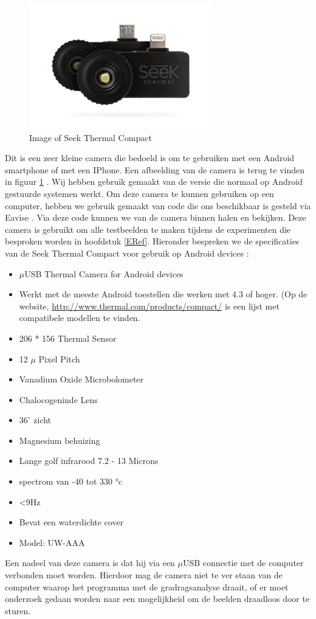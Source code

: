 \begin{figure}[hbp]
	\includegraphics[scale=0.75]{SeekThermalCompac}
	\caption{Image of Seek Thermal Compact}
	\label{imgSTC}
\end{figure}
Dit is een zeer kleine camera die bedoeld is om te gebruiken met een Android smartphone of met een IPhone. Een afbeelding van de camera is terug te vinden in figuur \ref{imgSTC} \cite{bibImgSTC}. Wij hebben gebruik gemaakt van de versie die normaal op Android gestuurde systemen werkt. Om deze camera te kunnen gebruiken op een computer, hebben we gebruik gemaakt van code die ons beschikbaar is gesteld via Eavise \cite{bibSTC}. Via deze code kunnen we van de camera binnen halen en bekijken. Deze camera is gebruikt om alle testbeelden te maken tijdens de experimenten die besproken worden in hoofdstuk \ref{ERef}. Hieronder bespreken we de specificaties van de Seek Thermal Compact voor gebruik op Android devices \cite{bibImgSTC}: 
\begin{itemize}
	\item $\mu$USB Thermal Camera for Android devices
	\item Werkt met de meeste Android toestellen die werken met 4.3 of hoger. (Op de website, \url{http://www.thermal.com/products/compact/} is een lijst met compatibele modellen te vinden. 
	\item 206 * 156 Thermal Sensor
	\item 12 $\mu$ Pixel Pitch
	\item Vanadium Oxide Microbolometer
	\item Chalocogeninde Lens
	\item $36^{\circ}$ zicht
	\item Magnesium behuizing
	\item Lange golf infrarood 7.2 - 13 Microns
	\item  spectrom van -40 tot 330 °c
	\item <9Hz
	\item Bevat een waterdichte cover
	\item Model: UW-AAA
\end{itemize}
Een nadeel van deze camera is dat hij via een $\mu$USB connectie met de computer verbonden moet worden. Hierdoor mag de camera niet te ver staan van de computer waarop het programma met de gradragsanalyse draait, of er moet onderzoek gedaan worden naar een mogelijkheid om de beelden draadloos door te sturen. 

